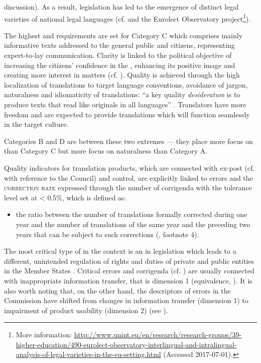 \documentclass[output=paper]{langsci/langscibook}
\begin{document}
discussion). As a result,  legislation has led to the emergence of distinct legal varieties of national legal languages (cf. \citealt{Biel2014} and the Eurolect Observatory project\footnote{More information: \url{http://www.unint.eu/en/research/research-groups/39-higher-education/490-eurolect-observatory-interlingual-and-intralingual-analysis-of-legal-varieties-in-the-eu-setting.html} (Accessed 2017-07-01).}).

The highest  and  requirements are set for Category C which comprises mainly informative texts addressed to the general public and  citizens, representing expert-to-lay communication. Clarity is linked to the political objective of increasing the  citizens’ confidence in the , enhancing its positive image and creating more interest in  matters (cf. \citealt[1, 12]{DGT2015j}). Quality is achieved through the high localization of translations to target language conventions, avoidance of jargon, naturalness and idiomaticity of translations: “a key quality \textit{desideratum} is to produce texts that read like originals in all languages” \citep[2, 13]{DGT2015j}. Translators have more freedom and are expected to provide translations which will function seamlessly in the target culture. 

Categories B and D are between these two extremes — they place more focus on  than Category C but more focus on naturalness than Category A.

Quality indicators for translation products, which are connected with ex-post  (cf.  with reference to the Council) and control, are explicitly linked to errors and the \textsc{correction rate} expressed through the number of corrigenda with the tolerance level set at < 0.5\%, which is defined as:

\begin{itemize}
\item 
the ratio between the number of translations formally corrected during one year and the number of translations of the same year and the preceding two years that can be subject to such corrections (\citealt[4]{DGT2016a}, footnote 4).
\end{itemize}

The most critical type of  in the  context is an  in  legislation which leads to a different, unintended regulation of rights and duties of private and public entities in the Member States \citep[2]{Kapko2005}. Critical errors and corrigenda (cf. \citealt{Bobek2009}) are usually connected with inappropriate information transfer, that is dimension 1 (equivalence, ). It is also worth noting that, on the other hand, the descriptors of errors in the Commission have shifted from changes in information transfer (dimension 1) to impairment of product usability (dimension 2) (see ).
\end{document}
